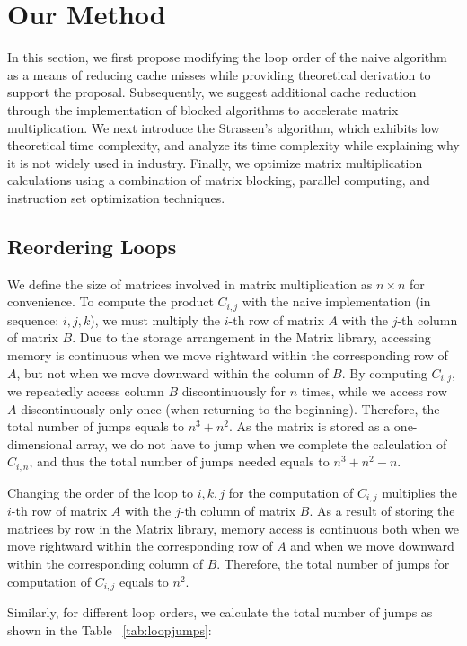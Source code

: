 \documentclass[conference]{IEEEtran}
\begin{document}
	\section{Our Method}
	In this section, we first propose modifying the loop order of the naive algorithm as a means of reducing cache misses while providing theoretical derivation to support the proposal. Subsequently, we suggest additional cache reduction through the implementation of blocked algorithms to accelerate matrix multiplication. We next introduce the Strassen's algorithm, which exhibits low theoretical time complexity, and analyze its time complexity while explaining why it is not widely used in industry. Finally, we optimize matrix multiplication calculations using a combination of matrix blocking, parallel computing, and instruction set optimization techniques.
	
	\subsection{Reordering Loops}
	We define the size of matrices involved in matrix multiplication as $n \times n$ for convenience. To compute the product $C_{i,j}$ with the naive implementation (in sequence: $i, j, k$), we must multiply the $i$-th row of matrix $A$ with the $j$-th column of matrix $B$. Due to the storage arrangement in the Matrix library, accessing memory is continuous when we move rightward within the corresponding row of $A$, but not when we move downward within the column of $B$. By computing $C_{i,j}$, we repeatedly access column $B$ discontinuously for $n$ times, while we access row $A$ discontinuously only once (when returning to the beginning). Therefore, the total number of jumps equals to $n^3 + n^2$. As the matrix is stored as a one-dimensional array, we do not have to jump when we complete the calculation of $C_{i,n}$, and thus the total number of jumps needed equals to $n^3 + n^2 - n$.
	
	Changing the order of the loop to $i,k,j$ for the computation of $C_{i,j}$ multiplies the $i$-th row of matrix $A$ with the $j$-th column of matrix $B$. As a result of storing the matrices by row in the Matrix library, memory access is continuous both when we move rightward within the corresponding row of $A$ and when we move downward within the corresponding column of $B$. Therefore, the total number of jumps for computation of $C_{i,j}$ equals to $n^2$.
	
	Similarly, for different loop orders, we calculate the total number of jumps as shown in the Table ~\ref{tab:loopjumps}:
	
\end{document}
